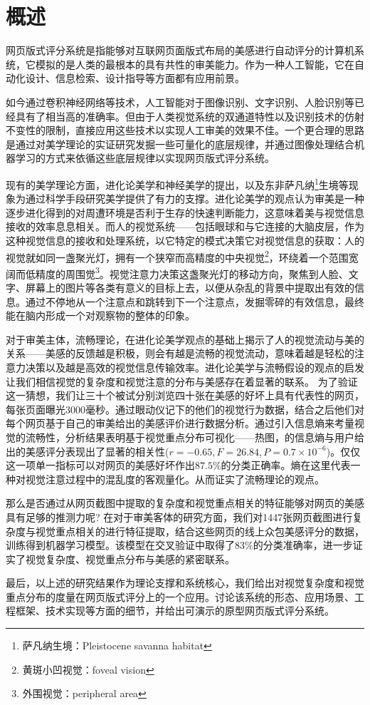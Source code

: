 
\chapter{概述}
\label{chap:introduction}
网页版式评分系统是指能够对互联网页面版式布局的美感进行自动评分的计算机系统，它模拟的是人类的最根本的具有共性的审美能力。作为一种人工智能，它在自动化设计、信息检索、设计指导等方面都有应用前景。

如今通过卷积神经网络等技术，人工智能对于图像识别、文字识别、人脸识别等已经具有了相当高的准确率。但由于人类视觉系统的双通道特性\cite{Goodale1992}以及识别技术的仿射不变性的限制，直接应用这些技术以实现人工审美的效果不佳。一个更合理的思路是通过对美学理论的实证研究发掘一些可量化的底层规律，并通过图像处理结合机器学习的方式来依循这些底层规律以实现网页版式评分系统。

现有的美学理论方面，进化论美学\cite{Stoddart1997, Shimamura2012}和神经美学\cite{Cinzia2009, Jacobs2003, Cela2011, Ramachandran1999}的提出，以及东非萨凡纳\footnote{萨凡纳生境：Pleistocene savanna habitat}生境\cite{Ruso2003}等现象为通过科学手段研究美学提供了有力的支撑。进化论美学的观点认为审美是一种逐步进化得到的对周遭环境是否利于生存的快速判断能力，这意味着美与视觉信息接收的效率息息相关。而人的视觉系统——包括眼球和与它连接的大脑皮层，作为这种视觉信息的接收和处理系统，以它特定的模式决策它对视觉信息的获取：人的视觉就如同一盏聚光灯\cite{Eriksen1972}，拥有一个狭窄而高精度的中央视觉\footnote{黄斑小凹视觉：foveal vision}，环绕着一个范围宽阔而低精度的周围觉\footnote{外围视觉：peripheral area}。视觉注意力决策这盏聚光灯的移动方向，聚焦到人脸、文字、屏幕上的图片等各类有意义的目标上去，以便从杂乱的背景中提取出有效的信息。通过不停地从一个注意点和跳转到下一个注意点，发掘零碎的有效信息，最终能在脑内形成一个对观察物的整体的印象。

对于审美主体，流畅理论\cite{Reber2004, Reber2012}，在进化论美学观点的基础上揭示了人的视觉流动与美的关系——美感的反馈越是积极，则会有越是流畅的视觉流动，意味着越是轻松的注意力决策以及越是高效的视觉信息传输效率。进化论美学与流畅假设的观点的启发让我们相信视觉的复杂度和视觉注意的分布与美感存在着显著的联系。
为了验证这一猜想，我们让三十个被试分别浏览四十张在美感的好坏上具有代表性的网页，每张页面曝光3000毫秒。通过眼动仪记下的他们的视觉行为数据，结合之后他们对每个网页基于自己的审美给出的美感评价进行数据分析。通过引入信息熵来考量视觉的流畅性，分析结果表明基于视觉重点分布可视化——热图，的信息熵与用户给出的美感评分表现出了显著的相关性($r=-0.65, F=26.84, P=0.7\times 10^{-6}$)。仅仅这一项单一指标可以对网页的美感好坏作出$87.5\%$的分类正确率。熵在这里代表一种对视觉注意过程中的混乱度的客观量化。从而证实了流畅理论的观点。

那么是否通过从网页截图中提取的复杂度和视觉重点相关的特征能够对网页的美感具有足够的推测力呢? 在对于审美客体的研究方面，我们对1447张网页截图进行复杂度与视觉重点相关的进行特征提取，结合这些网页的线上众包美感评分的数据，训练得到机器学习模型。该模型在交叉验证中取得了$83\%$的分类准确率，进一步证实了视觉复杂度、视觉重点分布与美感的紧密联系。

最后，以上述的研究结果作为理论支撑和系统核心，我们给出对视觉复杂度和视觉重点分布的度量在网页版式评分上的一个应用。讨论该系统的形态、应用场景、工程框架、技术实现等方面的细节，并给出可演示的原型网页版式评分系统。
